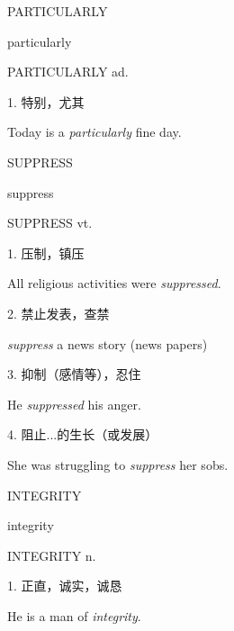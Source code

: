 \begin{flashcard}{
PARTICULARLY

particularly
}
\begin{center}
PARTICULARLY ad. 
\end{center}
1. 特别，尤其

Today is a \textit{particularly} fine day.

\end{flashcard}
\begin{flashcard}{
SUPPRESS

suppress
}
\begin{center}
SUPPRESS vt. 
\end{center}
1. 压制，镇压

All religious activities were \textit{suppressed}.

2. 禁止发表，查禁

\textit{suppress} a news story (news papers)

3. 抑制（感情等），忍住

He \textit{suppressed} his anger.

4. 阻止...的生长（或发展）

She was struggling to \textit{suppress} her sobs.

\end{flashcard}
\begin{flashcard}{
INTEGRITY

integrity
}
\begin{center}
INTEGRITY n. 
\end{center}
1. 正直，诚实，诚恳

He is a man of \textit{integrity}.

\end{flashcard}
